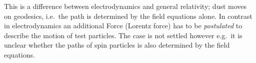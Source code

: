 \begin{remark}
This is a difference between electrodynamics and general relativity; dust moves
on geodesics, i.e.\ the path is determined by the field equations alone. In contrast
in electrodynamics an additional Force (Lorentz force) has to be
\emph{postulated} to describe the motion of test particles. The case is not
settled however e.g.\ it is unclear whether the paths of spin particles is also
determined by the field equations.
\end{remark}